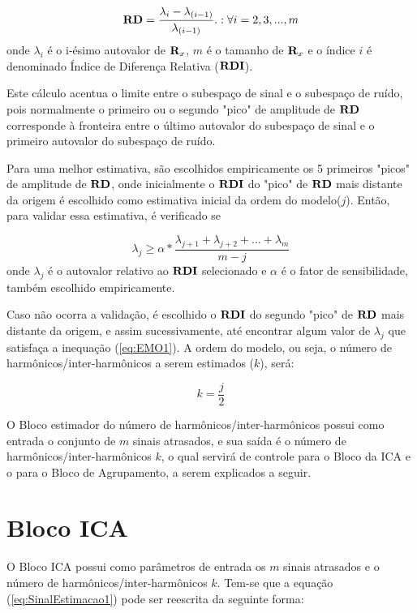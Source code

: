 \documentclass[a4paper,12pt]{monografia}
\theoremstyle{plain}
\theoremstyle{definition}
\theoremstyle{remark}
\begin{document}
\begin{equation}
    {\bf RD} = \frac{\lambda_{i}-\lambda_{(i-1)}}{\lambda_{(i-1)}} .:\forall i=2,3,...,m
    \label{eq:EMO}
\end{equation}
onde $\lambda_{i}$ é o i-ésimo autovalor de ${\bf R}_{x}$, $m$ é o tamanho de ${\bf R}_{x}$ e o índice $i$ é denominado Índice de Diferença Relativa (${\bf RDI}$). 

Este cálculo acentua o limite entre o subespaço de sinal e o subespaço de ruído, pois normalmente o primeiro ou o segundo "pico" de amplitude de ${\bf RD}$ corresponde à fronteira entre o último autovalor do subespaço de sinal e o primeiro autovalor do subespaço de ruído.

Para uma melhor estimativa, são escolhidos empiricamente os 5 primeiros "picos" de amplitude de ${\bf RD}$, onde inicialmente o ${\bf RDI}$ do "pico" de ${\bf RD}$ mais distante da origem é escolhido como estimativa inicial da ordem do modelo($j$). Então, para validar essa estimativa, é verificado se

\begin{equation}
    \lambda_{j} \geq \alpha*\frac{\lambda_{j+1}+\lambda_{j+2}+...+\lambda_{m}}{m-j}
    \label{eq:EMO1}
\end{equation}
onde $\lambda_{j}$ é o autovalor relativo ao ${\bf RDI}$ selecionado e $\alpha$ é o fator de sensibilidade, também escolhido empiricamente.

Caso não ocorra a validação, é escolhido o ${\bf RDI}$ do segundo "pico" de ${\bf RD}$ mais distante da origem, e assim sucessivamente, até encontrar algum valor de $\lambda_{j}$ que satisfaça a inequação (\ref{eq:EMO1}). A ordem do modelo, ou seja, o número de harmônicos/inter-harmônicos a serem estimados ($k$), será:

\begin{equation}
    k=\frac{j}{2}
    \label{eq:EMO2}
\end{equation}

O Bloco estimador do número de harmônicos/inter-harmônicos possui como entrada o conjunto de $m$ sinais atrasados, e sua saída é o número de harmônicos/inter-harmônicos $k$, o qual servirá de controle para o Bloco da ICA e o para o Bloco de Agrupamento, a serem explicados a seguir.

\section{Bloco ICA }

O Bloco ICA possui como parâmetros de entrada os $m$ sinais atrasados e o número de harmônicos/inter-harmônicos $k$. 
Tem-se que a equação (\ref{eq:SinalEstimacao1}) pode ser reescrita da seguinte forma:
\end{document}
